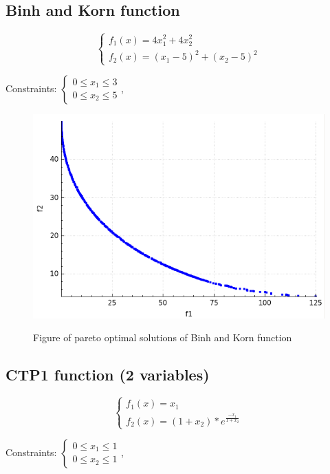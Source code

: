 \documentclass[a4paper, 11pt]{article}
\begin{document}
	\subsection{Binh and Korn function}
	$$\begin{cases}
		f_{1}(x)=4x_{1}^{2}+4x_{2}^{2}\\
		f_{2}(x)=(x_{1}-5)^{2}+(x_{2}-5)^{2}
	\end{cases}$$
		
	Constraints:
	$\begin{cases}
		0 \leq x_{1} \leq 3\\
		0 \leq x_{2} \leq 5
	\end{cases}$,
	
	\begin{figure}[H]
	\caption{Figure of pareto optimal solutions of Binh and Korn function}
	\centering
	\includegraphics[scale=0.4]{binh_korn}
	\label{fig:binh_korn}
	\end{figure}
	
	\subsection{CTP1 function (2 variables)}
	$$\begin{cases}
		f_{1}(x)=x_{1}\\
		f_{2}(x)=(1+x_{2})*e^{\frac{-x_{1}}{1+x_{2}}}
	\end{cases}$$
		
	Constraints:
	$\begin{cases}
		0 \leq x_{1} \leq 1\\
		0 \leq x_{2} \leq 1
	\end{cases}$,
	
\end{document}
